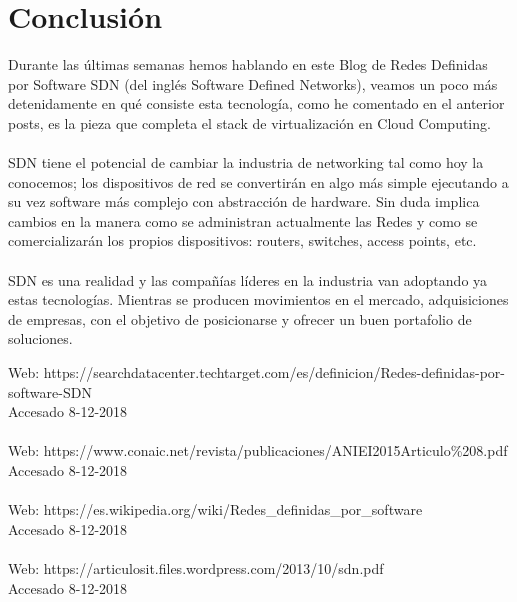 \documentclass[12pt]{report}
\begin{document}
\section{Conclusión}
{
Durante las últimas semanas hemos hablando en este Blog de Redes Definidas por Software SDN (del inglés Software Defined Networks), veamos un poco más detenidamente en qué consiste esta tecnología, como he comentado en el anterior posts, es la pieza que completa el stack de virtualización en Cloud Computing.\\\\

SDN tiene el potencial de cambiar la industria de networking tal como hoy la conocemos; los dispositivos de red se convertirán en algo más simple ejecutando a su vez software más complejo con abstracción de hardware. Sin duda implica cambios en la manera como se administran actualmente las Redes y como se comercializarán los propios dispositivos: routers, switches, access points, etc.
\\\\
SDN es una realidad y las compañías líderes en la industria van adoptando ya estas tecnologías. Mientras se producen movimientos en el mercado, adquisiciones de empresas, con el objetivo de posicionarse y ofrecer un buen portafolio de soluciones.
}

{
Web: https://searchdatacenter.techtarget.com/es/definicion/Redes-definidas-por-software-SDN\\
Accesado 8-12-2018\\\\
Web: https://www.conaic.net/revista/publicaciones/ANIEI2015Articulo\%208.pdf \\
Accesado 8-12-2018\\\\
Web: https://es.wikipedia.org/wiki/Redes_definidas_por_software\\
Accesado 8-12-2018\\\\
Web: https://articulosit.files.wordpress.com/2013/10/sdn.pdf\\
Accesado 8-12-2018\\\\
}




\end{document}
